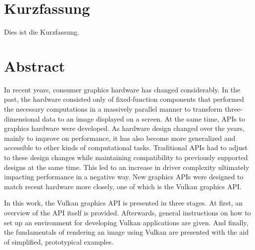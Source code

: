 
{
\chapter*{Kurzfassung}
\label{Abstract_de}
  Dies ist die Kurzfassung.

  \lipsum[1-2]

  \newpage
}
{}

\chapter*{Abstract}
\label{Abstract}






In recent years, consumer graphics hardware has changed considerably.
In the past, the hardware consisted only of fixed-function components that performed the necessary computations in a massively parallel manner to transform three-dimensional data to an image displayed on a screen.
At the same time, APIs to graphics hardware were developed.
As hardware design changed over the years, mainly to improve on performance, it has also become more generalized and accessible to other kinds of computational tasks.
Traditional APIs had to adjust to these design changes while maintaining compatibility to previously supported designs at the same time.
This led to an increase in driver complexity ultimately impacting performance in a negative way.
New graphics APIs were designed to match recent hardware more closely, one of which is the Vulkan graphics API.

In this work, the Vulkan graphics API is presented in three stages.
At first, an overview of the API itself is provided.
Afterwards, general instructions on how to set up an environment for developing Vulkan applications are given.
And finally, the fundamentals of rendering an image using Vulkan are presented with the aid of simplified, prototypical examples.
